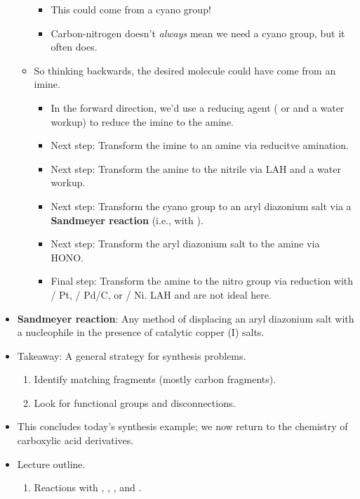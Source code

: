 \documentclass[../notes.tex]{subfiles}
\begin{document}
\begin{itemize}
\begin{itemize}
        \begin{itemize}
            \item This could come from a cyano group!
            \item Carbon-nitrogen doesn't \emph{always} mean we need a cyano group, but it often does.
        \end{itemize}
        \item So thinking backwards, the desired molecule could have come from an imine.
        \begin{itemize}
            \item In the forward direction, we'd use a reducing agent ( or  and a water workup) to reduce the imine to the amine.
            \item Next step: Transform the imine to an amine via reducitve amination.
            \item Next step: Transform the amine to the nitrile via LAH and a water workup.
            \item Next step: Transform the cyano group to an aryl diazonium salt via a \textbf{Sandmeyer reaction} (i.e., with ).
            \item Next step: Transform the aryl diazonium salt to the amine via HONO.
            \item Final step: Transform the amine to the nitro group via reduction with  / Pt,  / Pd/C, or  / Ni. LAH and  are not ideal here.
        \end{itemize}
    \end{itemize}
    \item \textbf{Sandmeyer reaction}: Any method of displacing an aryl diazonium salt with a nucleophile in the presence of catalytic copper (I) salts.
    \item Takeaway: A general strategy for synthesis problems.
    \begin{enumerate}
        \item Identify matching fragments (mostly carbon fragments).
        \item Look for functional groups and disconnections.
    \end{enumerate}
    \item This concludes today's synthesis example; we now return to the chemistry of carboxylic acid derivatives.
    \item Lecture outline.
    \begin{enumerate}[start=5]
        \item Reactions with , , , and .

\end{enumerate}
\end{itemize}
\end{document}
